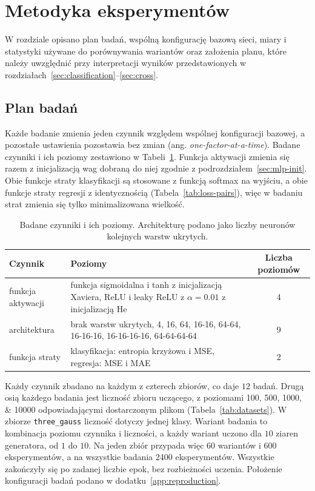 \section{Metodyka eksperymentów}
\label{sec:methodology}

W rozdziale opisano plan badań, wspólną konfigurację bazową sieci, miary i statystyki używane do porównywania wariantów oraz założenia planu, które należy uwzględnić przy interpretacji wyników przedstawionych w rozdziałach~\ref{sec:classification}--\ref{sec:cross}.

\subsection{Plan badań}
\label{sec:methodology-plan}

Każde badanie zmienia jeden czynnik względem wspólnej konfiguracji bazowej, a pozostałe ustawienia pozostawia bez zmian (ang. \textit{one-factor-at-a-time}). Badane czynniki i ich poziomy zestawiono w Tabeli~\ref{tab:studies}. Funkcja aktywacji zmienia się razem z inicjalizacją wag dobraną do niej zgodnie z podrozdziałem~\ref{sec:mlp-init}. Obie funkcje straty klasyfikacji są stosowane z funkcją softmax na wyjściu, a obie funkcje straty regresji z identycznością (Tabela~\ref{tab:loss-pairs}), więc w badaniu strat zmienia się tylko minimalizowana wielkość.

\begin{table}[H]
    \centering
    \caption{Badane czynniki i ich poziomy. Architekturę podano jako liczby neuronów kolejnych warstw ukrytych.}
    \label{tab:studies}
    \begin{tabularx}{\textwidth}{lXc}
        \toprule
        Czynnik & Poziomy & Liczba poziomów \\
        \midrule
        funkcja aktywacji & funkcja sigmoidalna i tanh z inicjalizacją Xaviera, ReLU i leaky ReLU z $\alpha = \num{0.01}$ z inicjalizacją He & 4 \\
        architektura & brak warstw ukrytych, 4, 16, 64, 16-16, 64-64, 16-16-16, 16-16-16-16, 64-64-64-64 & 9 \\
        funkcja straty & klasyfikacja: entropia krzyżowa i MSE, regresja: MSE i MAE & 2 \\
        \bottomrule
    \end{tabularx}
\end{table}

Każdy czynnik zbadano na każdym z czterech zbiorów, co daje $12$ badań. Drugą osią każdego badania jest liczność zbioru uczącego, z poziomami \numlist{100;500;1000;10000} odpowiadającymi dostarczonym plikom (Tabela~\ref{tab:datasets}). W zbiorze \texttt{three\_gauss} liczność dotyczy jednej klasy. Wariant badania to kombinacja poziomu czynnika i liczności, a każdy wariant uczono dla $10$ ziaren generatora, od $1$ do $10$. Na jeden zbiór przypada więc $60$ wariantów i $600$ eksperymentów, a na wszystkie badania \num{2400} eksperymentów. Wszystkie zakończyły się po zadanej liczbie epok, bez rozbieżności uczenia. Położenie konfiguracji badań podano w dodatku~\ref{app:reproduction}.

